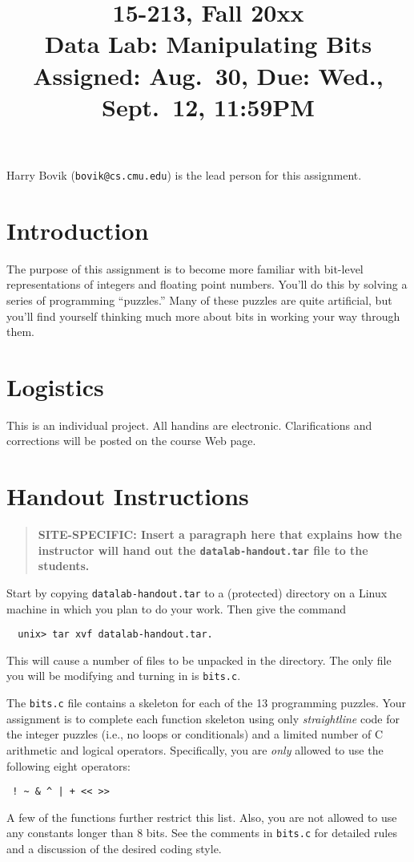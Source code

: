 \documentclass[11pt]{article}
\begin{document}
\title{15-213, Fall 20xx\\
Data Lab: Manipulating Bits\\
Assigned: Aug.~30, Due: Wed., Sept.~12, 11:59PM
}

\author{}
\date{}

\maketitle

Harry Bovik ({\tt bovik@cs.cmu.edu}) is the lead person for
this assignment.

\section{Introduction}
The purpose of this assignment is to become more familiar with
bit-level representations of integers and floating point numbers.
You'll do this by solving a series of programming ``puzzles.'' Many of
these puzzles are quite artificial, but you'll find yourself thinking
much more about bits in working your way through them.

\section{Logistics}

This is an individual project. All handins are electronic.
Clarifications and corrections will be posted on the course Web page.

\section{Handout Instructions}

\begin{quote}
\bf SITE-SPECIFIC: Insert a paragraph here that explains how the
instructor will hand out the {\tt datalab-handout.tar} file to the
students.
\end{quote}

Start by copying {\tt datalab-handout.tar} to a (protected) directory
on a Linux machine in which you plan to do your work.  Then give the
command
\begin{verbatim}
  unix> tar xvf datalab-handout.tar.  
\end{verbatim}
This will cause a number of files to be unpacked in the directory.
The only file you will be modifying and turning in is {\tt bits.c}.

The {\tt bits.c} file contains a skeleton for each of the 13
programming puzzles.  Your assignment is to complete each function
skeleton using only {\em straightline} code for the integer puzzles
(i.e., no loops or conditionals) and a limited number of C arithmetic
and logical operators. Specifically, you are {\em only} allowed to use
the following eight operators:
\begin{verbatim}
 ! ~ & ^ | + << >>
\end{verbatim}
A few of the functions further restrict this list.  Also, you are not
allowed to use any constants longer than 8 bits.  See the comments in
{\tt bits.c} for detailed rules and a discussion of the desired coding
style.
\end{document}
